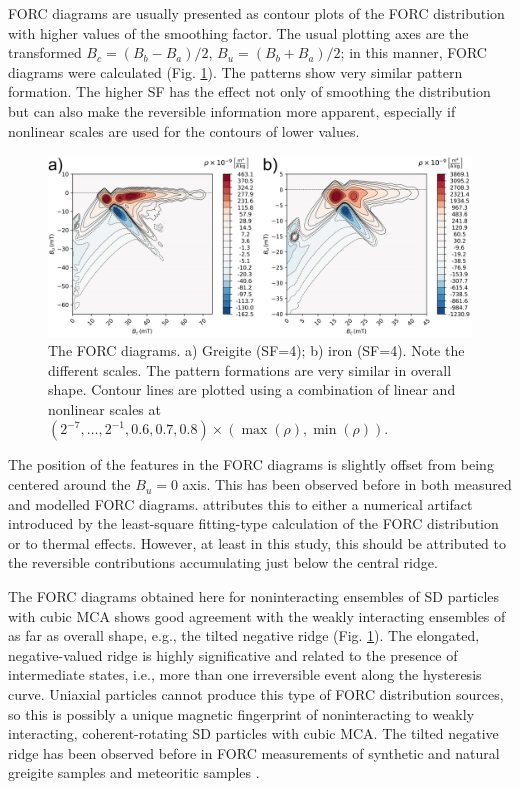 FORC diagrams are usually presented as contour plots of the FORC distribution with higher values of the smoothing factor. The usual plotting axes are the transformed $B_c = (B_b - B_a)/2$, $B_u = (B_b + B_a)/2$; in this manner, FORC diagrams were calculated (Fig. \ref{FIG04}). The patterns show very similar pattern formation. The higher SF has the effect not only of smoothing the distribution but can also make the reversible information more apparent, especially if nonlinear scales are used for the contours of lower values.
\begin{figure}
\includegraphics[width=\textwidth]{research-2/figs/FIG04.pdf}
\caption[FORC diagrams (dipolar model)]{The FORC diagrams. a) Greigite (SF=4); b) iron (SF=4). Note the different scales. The pattern formations are very similar in overall shape. Contour lines are plotted using a combination of linear and nonlinear scales at $(2^{-7},\ldots, 2^{-1},0.6, 0.7, 0.8)\times (\max (\rho), \min (\rho))$.}
\label{FIG04}
\end{figure}
\par
The position of the features in the FORC diagrams is slightly offset from being centered around the $B_u=0$ axis. This has been observed before in both measured and modelled FORC diagrams. \citet{Newell2005} attributes this to either a numerical artifact introduced by the least-square fitting-type calculation of the FORC distribution or to thermal effects. However, at least in this study, this should be attributed to the reversible contributions accumulating just below the central ridge.\par

The FORC diagrams obtained here for noninteracting ensembles of SD particles with cubic MCA shows good agreement with the weakly interacting ensembles of \citet{Harrison2014} as far as overall shape, e.g., the tilted negative ridge (Fig. \ref{FIG04}). The elongated, negative-valued ridge is highly significative and related to the presence of intermediate states, i.e., more than one irreversible event along the hysteresis curve. Uniaxial particles cannot produce this type of FORC distribution sources, so this is possibly a unique magnetic fingerprint of noninteracting to weakly interacting, coherent-rotating SD particles with cubic MCA. The tilted negative ridge has been observed before in FORC measurements of synthetic and natural greigite samples \citep{Roberts2011} and meteoritic samples \citep{Acton2007}.\par

